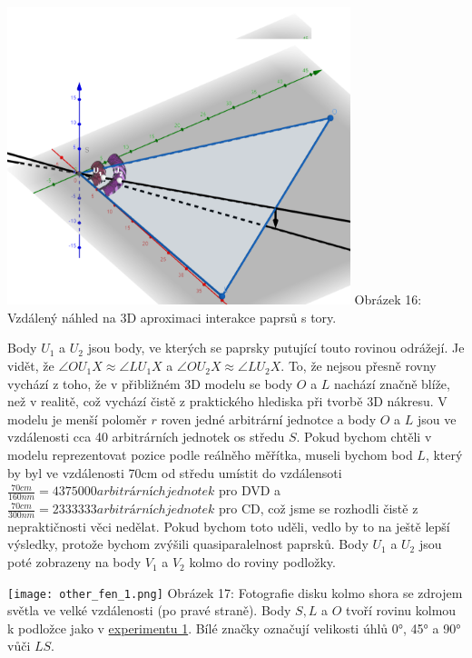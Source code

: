 \documentclass[titlepage]{article}
\begin{document}
 \label{image:16}
\begin{center}
    \includegraphics[width = 10cm]{3D_2.png}
    \linebreak
    Obrázek 16: Vzdálený náhled na 3D aproximaci interakce paprsů s tory.
\end{center}

Body $U_{1}$ a $U_{2}$ jsou body, ve kterých se paprsky putující touto rovinou odrážejí. Je vidět, že $\angle OU_1X \approx \angle LU_1X$ a $\angle OU_2X \approx \angle LU_2X$. To, že nejsou přesně rovny vychází z toho, že v přibližném 3D modelu se body $O$ a $L$ nachází značně blíže, než v realitě, což vychází čistě z praktického hlediska při tvorbě 3D nákresu. V modelu je menší poloměr $r$ roven jedné arbitrární jednotce a body $O$ a $L$ jsou ve vzdálenosti cca 40 arbitrárních jednotek os středu $S$.
Pokud bychom chtěli v modelu reprezentovat pozice podle reálněho měřítka, museli bychom bod $L$, který by byl ve vzdálenosti 70cm od středu umístit do vzdálensoti $\frac{70cm}{160nm}=4375000 arbitrárních jednotek$ pro DVD a $\frac{70cm}{300nm} = 2333333 arbitrárních jednotek$ pro CD, což jsme se rozhodli čistě z nepraktičnosti věci nedělat.
Pokud bychom toto uděli, vedlo by to na ještě lepší výsledky, protože bychom zvýšili quasiparalelnost paprsků.
Body $U_1$ a $U_2$ jsou poté zobrazeny na body $V_1$ a $V_2$ kolmo do roviny podložky.

 \label{image:17}
\begin{center}
    \texttt{[image: other\_fen\_1.png]}
    \linebreak
    Obrázek 17: Fotografie disku kolmo shora se zdrojem světla ve velké vzdálenosti (po pravé straně). Body $S, L$ a $O$ tvoří rovinu kolmou k podložce jako v \hyperref[exp:1]{experimentu 1}. Bílé značky označují velikosti úhlů 0°, 45° a 90° vůči $LS$.
\end{center}
\end{document}
